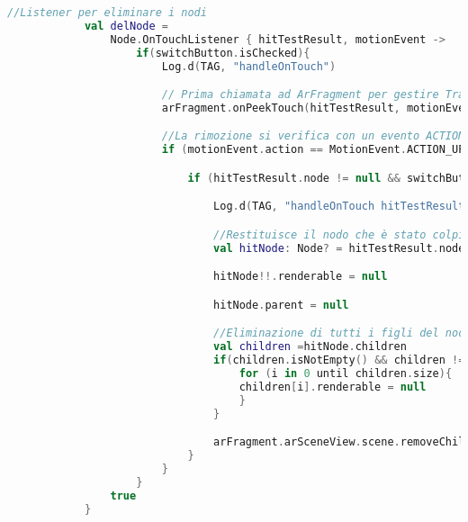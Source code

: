 \documentclass[crop=false, class=book]{standalone}
\begin{document}
	\begin{center}
		\begin{minipage}{0.95\textwidth}
			\begin{lstlisting}[caption={Eliminazione di un nodo dalla scena in Plane Detection}, label={lst: delete-node}, language=Kotlin]
			//Listener per eliminare i nodi
        	val delNode =
            	Node.OnTouchListener { hitTestResult, motionEvent ->
                	if(switchButton.isChecked){
                    	Log.d(TAG, "handleOnTouch")

                    	// Prima chiamata ad ArFragment per gestire TrasformableNode
                    	arFragment.onPeekTouch(hitTestResult, motionEvent)

                    	//La rimozione si verifica con un evento ACTION_UP
                    	if (motionEvent.action == MotionEvent.ACTION_UP) {

                        	if (hitTestResult.node != null && switchButton.isChecked) {

                            	Log.d(TAG, "handleOnTouch hitTestResult.getNode() != null")

                            	//Restituisce il nodo che è stato colpito dal hitTest
                            	val hitNode: Node? = hitTestResult.node

                            	hitNode!!.renderable = null

                            	hitNode.parent = null

                            	//Eliminazione di tutti i figli del nodo
                            	val children =hitNode.children
                            	if(children.isNotEmpty() && children != null){
                                	for (i in 0 until children.size){
                                    children[i].renderable = null
                                	}
                            	}

                            	arFragment.arSceneView.scene.removeChild(hitNode)
                        	}
                    	}
                	}
                true
            }
			\end{lstlisting}
		\end{minipage}
	\end{center}
	
			
	
\end{document}
